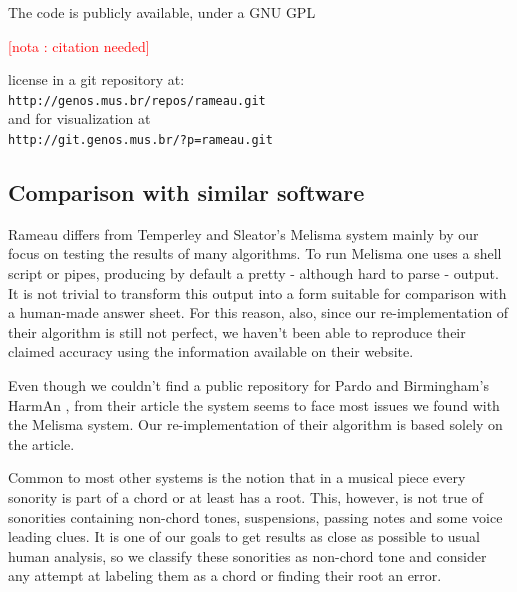 \documentclass{article}
\newcounter{notacounter}
\newcommand{\nota}[1]{
  \addtocounter{notacounter}{1}
  \textcolor{red}{[nota \arabic{notacounter}: #1]}
}
\begin{document}
The code is publicly available, under a GNU GPL \nota{citation needed}
license in a git \cite{baudis:_git_users_manual} repository
at:\\ \texttt{http://genos.mus.br/repos/rameau.git}\\ and for
visualization at\\ \texttt{http://git.genos.mus.br/?p=rameau.git}

\subsection{Comparison with similar software}
\label{sec:differences-from-similar-software}

Rameau differs from Temperley and Sleator's Melisma
\cite{temperley99:modeling} system mainly by our focus on testing the
results of many algorithms. To run Melisma one uses a shell script or
pipes, producing by default a pretty - although hard to parse -
output. It is not trivial to transform this output into a form
suitable for comparison with a human-made answer sheet. For this
reason, also, since our re-implementation of their algorithm is still
not perfect, we haven't been able to reproduce their claimed accuracy
using the information available on their website.

Even though we couldn't find a public repository for Pardo and
Birmingham's HarmAn \cite{pardo99:automated}, from their article the
system seems to face most issues we found with the Melisma system. Our
re-implementation of their algorithm is based solely on the article.

Common to most other systems is the notion that in a musical piece
every sonority is part of a chord or at least has a root. This,
however, is not true of sonorities containing non-chord tones,
suspensions, passing notes and some voice leading clues. It is one of
our goals to get results as close as possible to usual human analysis,
so we classify these sonorities as non-chord tone and consider any
attempt at labeling them as a chord or finding their root an error.
\end{document}
